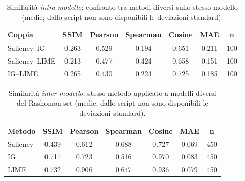 \documentclass{article}
\begin{document}
\begin{table}[h!]
      \centering
      \renewcommand{\arraystretch}{1.1}
      \begin{tabular}{lccccc c}
            \hline
            \textbf{Coppia} & \textbf{SSIM} & \textbf{Pearson} & \textbf{Spearman} & \textbf{Cosine} & \textbf{MAE} & \textbf{n} \\
            \hline
            Saliency–IG     & 0.263         & 0.529            & 0.194             & 0.651           & 0.211        & 100        \\
            Saliency–LIME   & 0.213         & 0.477            & 0.424             & 0.658           & 0.151        & 100        \\
            IG–LIME         & 0.265         & 0.430            & 0.224             & 0.725           & 0.185        & 100        \\
            \hline
      \end{tabular}
      \caption{Similarità \emph{intra-modello}: confronto tra metodi diversi sullo stesso modello (medie; dallo script non sono disponibili le deviazioni standard).}
      \label{tab:sim_intra}
\end{table}

\begin{table}[h!]
      \centering
      \renewcommand{\arraystretch}{1.1}
      \begin{tabular}{lccccc c}
            \hline
            \textbf{Metodo} & \textbf{SSIM} & \textbf{Pearson} & \textbf{Spearman} & \textbf{Cosine} & \textbf{MAE} & \textbf{n} \\
            \hline
            Saliency        & 0.439         & 0.612            & 0.688             & 0.727           & 0.069        & 450        \\
            IG              & 0.711         & 0.723            & 0.516             & 0.970           & 0.083        & 450        \\
            LIME            & 0.732         & 0.906            & 0.647             & 0.936           & 0.079        & 450        \\
            \hline
      \end{tabular}
      \caption{Similarità \emph{inter-modello}: stesso metodo applicato a modelli diversi del Rashomon set (medie; dallo script non sono disponibili le deviazioni standard).}
      \label{tab:sim_inter}
\end{table}
\end{document}
